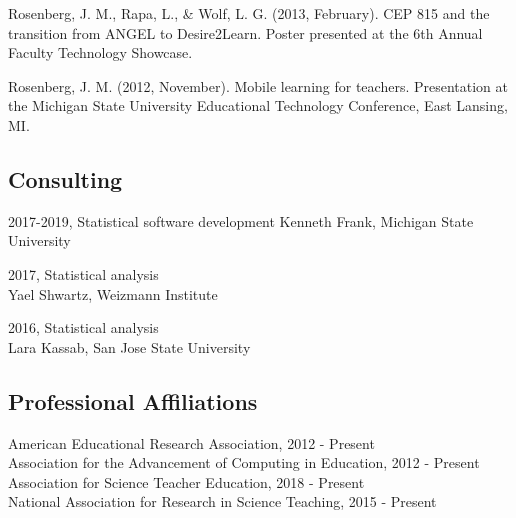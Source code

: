 \documentclass[14,]{article}
\begin{document}
Rosenberg, J. M., Rapa, L., \& Wolf, L. G. (2013, February). CEP 815 and
the transition from ANGEL to Desire2Learn. Poster presented at the 6th
Annual Faculty Technology Showcase.

Rosenberg, J. M. (2012, November). Mobile learning for teachers.
Presentation at the Michigan State University Educational Technology
Conference, East Lansing, MI.

\subsection{Consulting}\label{consulting}

2017-2019, Statistical software development Kenneth Frank, Michigan
State University

2017, Statistical analysis\\
Yael Shwartz, Weizmann Institute

2016, Statistical analysis\\
Lara Kassab, San Jose State University

\subsection{Professional Affiliations}\label{professional-affiliations}

American Educational Research Association, 2012 - Present\\
Association for the Advancement of Computing in Education, 2012 -
Present\\
Association for Science Teacher Education, 2018 - Present\\
National Association for Research in Science Teaching, 2015 - Present
\end{document}
